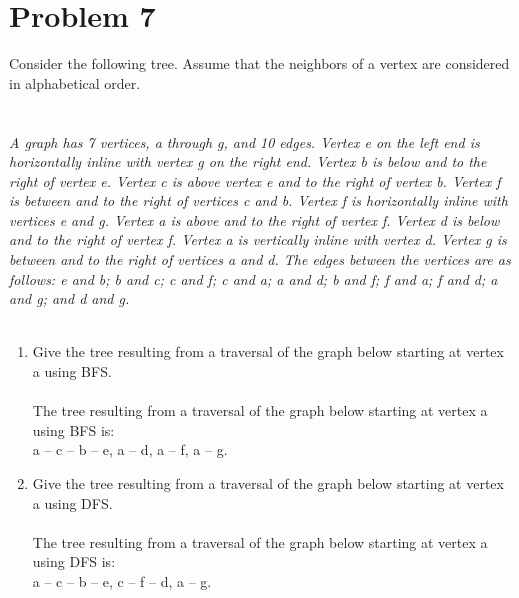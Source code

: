 \documentclass{amsart}
\theoremstyle{definition}
\theoremstyle{Exercise}
\theoremstyle{remark}
\theoremstyle{rule}
\numberwithin{equation}{section}
\begin{document}
\section*{Problem 7}
Consider the following tree. Assume that the neighbors of a vertex are considered in alphabetical order.
\\
\\\\
{\color{blue}{\bf Figure 15:} \emph{A graph has 7 vertices, a through g, and 10 edges. Vertex e on the left end is horizontally inline with vertex g on the right end. Vertex b is below and to the right of vertex e. Vertex c is above vertex e and to the right of vertex b. Vertex f is between and to the right of vertices c and b. Vertex f is horizontally inline with vertices e and g. Vertex a is above and to the right of vertex f. Vertex d is below and to the right of vertex f. Vertex a is vertically inline with vertex d. Vertex g is between and to the right of vertices a and d. The edges between the vertices are as follows: e and b; b and c; c and f; c and a; a and d; b and f; f and a; f and d; a and g; and d and g.
}
}
\\
\\
\begin{enumerate}[label=(\alph*)]
    \item Give the tree resulting from a traversal of the graph below starting at vertex a using BFS. \\\\
    The tree resulting from a traversal of the graph below starting at vertex a using BFS is:\\
    a -- c -- b -- e, a -- d, a -- f, a -- g.
\\
    \item Give the tree resulting from a traversal of the graph below starting at vertex a using DFS.\\\\
    The tree resulting from a traversal of the graph below starting at vertex a using DFS is:\\
    a -- c -- b -- e, c -- f -- d, a -- g.
\end{enumerate}

\newpage
\end{document}
